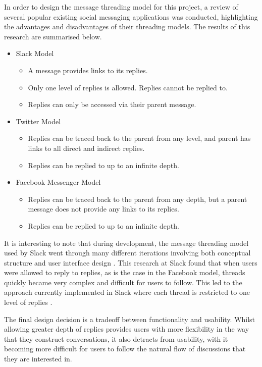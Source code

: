 In order to design the message threading model for this project, a review of several popular existing social messaging applications was conducted, highlighting the advantages and disadvantages of their threading models. The results of this research are summarised below.

\begin{itemize}
  \item Slack Model
    \begin{itemize}
      \item A message provides links to its replies.
      \item Only one level of replies is allowed. Replies cannot be replied to.
      \item Replies can only be accessed via their parent message.
    \end{itemize}
  \item Twitter Model
    \begin{itemize}
      \item Replies can be traced back to the parent from any level, and parent has links to all direct and indirect replies.
      \item Replies can be replied to up to an infinite depth.
    \end{itemize}
  \item Facebook Messenger Model
    \begin{itemize}
      \item Replies can be traced back to the parent from any depth, but a parent message does not provide any links to its replies.
      \item Replies can be replied to up to an infinite depth.
    \end{itemize}
\end{itemize}

It is interesting to note that during development, the message threading model used by Slack went through many different iterations involving both conceptual structure and user interface design \cite{florin2018}. This research at Slack found that when users were allowed to reply to replies, as is the case in the Facebook model, threads quickly became very complex and difficult for users to follow. This led to the approach currently implemented in Slack where each thread is restricted to one level of replies \cite{florin2018}.

The final design decision is a tradeoff between functionality and usability. Whilst allowing greater depth of replies provides users with more flexibility in the way that they construct conversations, it also detracts from usability, with it becoming more difficult for users to follow the natural flow of discussions that they are interested in. 

